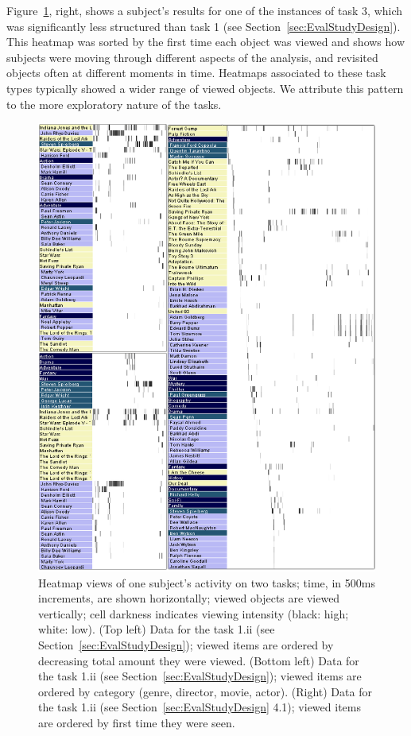 Figure~\ref{fig:heatmap}, right, shows a subject's results for one of the instances of task 3, which was significantly less structured than task 1 (see Section~\ref{sec:EvalStudyDesign}). This heatmap  was sorted by the first time each object was viewed and shows how subjects were moving through different aspects of the analysis, and revisited objects often at different moments in time. Heatmaps associated to these task types typically showed a wider range of viewed objects. We attribute this pattern to the more exploratory nature of the tasks.  

\begin{figure}[!ht]
  \centering
  \includegraphics[width=0.75\linewidth]{images/heatmaps.eps}
  \caption{Heatmap views of one subject's activity on two tasks; time, in 500ms increments, are shown horizontally; viewed objects are viewed vertically; cell darkness indicates viewing intensity (black: high; white: low). (Top left) Data for the task 1.ii (see Section~\ref{sec:EvalStudyDesign}); viewed items are ordered by decreasing total amount they were viewed. (Bottom left) Data for the task 1.ii (see Section~\ref{sec:EvalStudyDesign}); viewed items are ordered by category (genre, director, movie, actor). (Right) Data for the task 1.ii (see Section~\ref{sec:EvalStudyDesign} 4.1); viewed items are ordered by first time they were seen. 
}
	\label{fig:heatmap}
\end{figure}


